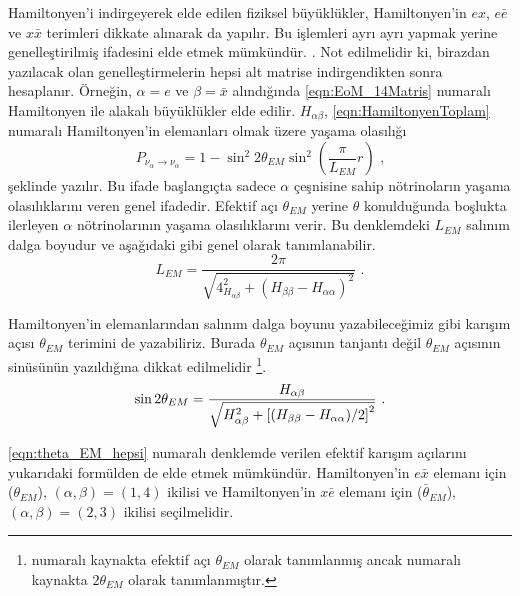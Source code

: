 Hamiltonyen'i indirgeyerek elde edilen fiziksel büyüklükler, Hamiltonyen'in $ ex $, $ e\bar{e} $ ve $ x\bar{x} $ terimleri dikkate alınarak da yapılır. Bu işlemleri ayrı ayrı yapmak yerine genelleştirilmiş ifadesini elde etmek mümkündür. \cite{Likhachev:1990ki,Broggini:2012df}. Not edilmelidir ki, birazdan yazılacak olan genelleştirmelerin hepsi alt matrise indirgendikten sonra hesaplanır. Örneğin, $ \alpha=e $ ve $ \beta=\bar{x} $ alındığında \eqref{eqn:EoM_14Matris} numaralı Hamiltonyen ile alakalı büyüklükler elde edilir. $ H_{\alpha\beta} $, \eqref{eqn:HamiltonyenToplam} numaralı Hamiltonyen'in elemanları olmak üzere yaşama olasılığı \cite{Giunti:2014ixa}
\begin{equation}
	P_{\nu_{\alpha} \rightarrow \nu_{\alpha}} = 1 - \sin^{2} 2\theta_{EM} \sin^{2}(\frac{\pi}{L_{EM}}r) \text{ ,}
\end{equation}
şeklinde yazılır. Bu ifade başlangıçta sadece $ \alpha $ çeşnisine sahip nötrinoların yaşama olasılıklarını veren genel ifadedir. Efektif açı $ \theta_{EM} $ yerine $ \theta $ konulduğunda boşlukta ilerleyen $ \alpha $ nötrinolarının yaşama olasılıklarını verir. Bu denklemdeki $ L_{EM} $ salınım dalga boyudur ve aşağıdaki gibi genel olarak tanımlanabilir.
\begin{equation}
	L_{EM}= \frac{2\pi}{\sqrt{4_{H_{\alpha\beta}}^2+(H_{\beta\beta} - H_{\alpha\alpha})^{2}}} \text{ .}
\end{equation}

Hamiltonyen'in elemanlarından salınım dalga boyunu yazabileceğimiz gibi karışım açısı $ \theta_{EM} $ terimini de yazabiliriz. Burada $ \theta_{EM} $ açısının tanjantı değil $ \theta_{EM} $ açısının sinüsünün yazıldığına dikkat edilmelidir \footnote[1]{\cite{Broggini:2012df} numaralı kaynakta efektif açı $ \theta_{EM} $ olarak tanımlanmış ancak \cite{Likhachev:1990ki} numaralı kaynakta $ 2\theta_{EM} $ olarak tanımlanmıştır.}.
\begin{equation}
	\sin 2\theta_{EM} = \frac{H_{\alpha\beta}}{\sqrt{H^{2}_{\alpha\beta} + \qty[(H_{\beta\beta} - H_{\alpha\alpha})/2]^{2}}} \text{ .}
\end{equation}

\eqref{eqn:theta_EM_hepsi} numaralı denklemde verilen efektif karışım açılarını yukarıdaki formülden de elde etmek mümkündür. Hamiltonyen'in $ e\bar{x} $ elemanı için ($ \theta_{EM} $), $ (\alpha,\beta)=(1,4) $ ikilisi ve Hamiltonyen'in $ x\bar{e} $ elemanı için ($ \bar{\theta}_{EM} $), $ (\alpha,\beta)=(2,3) $ ikilisi seçilmelidir.

